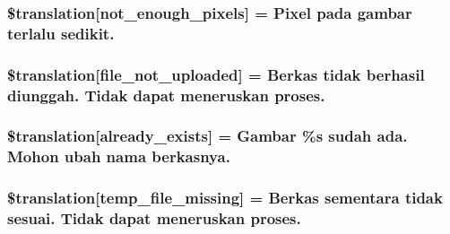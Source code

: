 \subsubsection[{\$translation}]{\setlength{\rightskip}{0pt plus 5cm}\$translation\mbox{[}\textquotesingle{}not\+\_\+enough\+\_\+pixels\textquotesingle{}\mbox{]} = \textquotesingle{}Pixel pada gambar terlalu sedikit.\textquotesingle{}}\label{class_8upload_8id___i_d_8php_a1fe342c27ce61f4ff4e0120ba647033e}
\hypertarget{class_8upload_8id___i_d_8php_a4ce76e7be0b3a03c2b47f6d70c21832e}{}
\subsubsection[{\$translation}]{\setlength{\rightskip}{0pt plus 5cm}\$translation\mbox{[}\textquotesingle{}file\+\_\+not\+\_\+uploaded\textquotesingle{}\mbox{]} = \textquotesingle{}Berkas tidak berhasil diunggah. Tidak dapat meneruskan proses.\textquotesingle{}}\label{class_8upload_8id___i_d_8php_a4ce76e7be0b3a03c2b47f6d70c21832e}
\hypertarget{class_8upload_8id___i_d_8php_afd84e910217f04139f567c41e292afa5}{}
\subsubsection[{\$translation}]{\setlength{\rightskip}{0pt plus 5cm}\$translation\mbox{[}\textquotesingle{}already\+\_\+exists\textquotesingle{}\mbox{]} = \textquotesingle{}Gambar \%s sudah ada. Mohon ubah nama berkasnya.\textquotesingle{}}\label{class_8upload_8id___i_d_8php_afd84e910217f04139f567c41e292afa5}
\hypertarget{class_8upload_8id___i_d_8php_ab0fa87a88aba2624004581eed0633325}{}
\subsubsection[{\$translation}]{\setlength{\rightskip}{0pt plus 5cm}\$translation\mbox{[}\textquotesingle{}temp\+\_\+file\+\_\+missing\textquotesingle{}\mbox{]} = \textquotesingle{}Berkas sementara tidak sesuai. Tidak dapat meneruskan proses.\textquotesingle{}}\label{class_8upload_8id___i_d_8php_ab0fa87a88aba2624004581eed0633325}
\hypertarget{class_8upload_8id___i_d_8php_aceaaf7355acaaf10f0ae60378d03c468}{}
